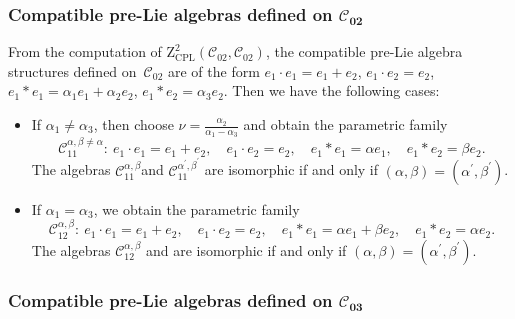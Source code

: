 \documentclass[10pt,a4paper]{amsart}
\numberwithin{equation}{section}
\begin{document}
\subsubsection[Compatible pre-Lie algebras defined on C\_\{02\}]{Compatible pre-Lie algebras defined on $\boldsymbol{\mathcal{C}_{02}}$}

From the computation of $\mathrm{Z}_{\mathrm{CPL}}^{2}(\mathcal{C}_{02},%
\mathcal{C}_{02})$, the compatible pre-Lie algebra structures defined on~$%
\mathcal{C}_{02}$ are of the form
$
e_{1}\cdot e_{1}=e_{1}+e_{2}$, $ e_{1}\cdot e_{2}=e_{2}$, $
e_{1}\ast e_{1}=\alpha _{1}e_{1}+\alpha _{2}e_{2}$, $ e_{1}\ast
e_{2}=\alpha _{3}e_{2}$.
Then we have the following cases:
\begin{itemize}\itemsep=0pt
\item If $\alpha _{1}\neq\alpha _{3}$, then choose $\nu =\frac{\alpha _{2}%
}{\alpha _{1}-\alpha _{3}}$ and obtain the parametric family
\[
\mathcal{C}_{11}^{\alpha ,\beta\neq \alpha }\colon \
e_{1}\cdot e_{1}=e_{1}+e_{2},\quad e_{1}\cdot e_{2}=e_{2},\quad
e_{1}\ast e_{1}=\alpha e_{1},\quad e_{1}\ast e_{2}=\beta e_{2}.
\]
The algebras $\mathcal{C}_{11}^{\alpha ,\beta }$and $\mathcal{C}_{11}^{\alpha
^{\prime },\beta ^{\prime }}$ are isomorphic if and only if $(\alpha,\beta)= (\alpha^{\prime },\beta ^{\prime })$.

\item If $\alpha _{1}=\alpha _{3}$, we obtain the parametric family
\[
\mathcal{C}_{12}^{\alpha ,\beta } \colon \
e_{1}\cdot e_{1}=e_{1}+e_{2},\quad e_{1}\cdot e_{2}=e_{2}, \quad
e_{1}\ast e_{1}=\alpha e_{1}+\beta e_{2},\quad e_{1}\ast e_{2}=\alpha e_{2}.
\]
The algebras $\mathcal{C}_{12}^{\alpha ,\beta }$ and  are isomorphic if and only if $(\alpha,\beta)= (\alpha^{\prime },\beta ^{\prime })$.
\end{itemize}

\subsubsection[Compatible pre-Lie algebras defined on C\_\{03\}]{Compatible pre-Lie algebras defined on $\boldsymbol{\mathcal{C}_{03}}$}
\end{document}
